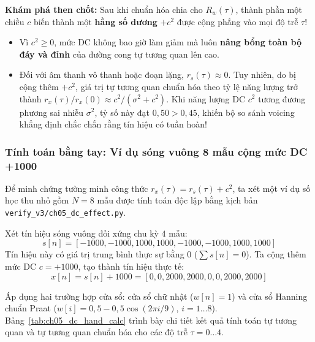 \begin{physicalinsight}
\textbf{Khám phá then chốt:} Sau khi chuẩn hóa chia cho $R_w(\tau)$, thành phần một chiều $c$ biến thành một \textbf{hằng số dương} $+c^2$ được cộng phẳng vào mọi độ trễ $\tau$!
\begin{itemize}[leftmargin=1.5em, itemsep=2pt]
    \item Vì $c^2 \ge 0$, mức DC không bao giờ làm giảm mà luôn \textbf{nâng bổng toàn bộ đáy và đỉnh} của đường cong tự tương quan lên cao.
    \item Đối với âm thanh vô thanh hoặc đoạn lặng, $r_s(\tau) \approx 0$. Tuy nhiên, do bị cộng thêm $+c^2$, giá trị tự tương quan chuẩn hóa theo tỷ lệ năng lượng trở thành $r_x(\tau)/r_x(0) \approx c^2 / (\sigma^2 + c^2)$. Khi năng lượng DC $c^2$ tương đương phương sai nhiễu $\sigma^2$, tỷ số này đạt $0{,}50 > 0{,}45$, khiến bộ so sánh voicing khẳng định chắc chắn rằng tín hiệu có tuần hoàn!
\end{itemize}
\end{physicalinsight}

\subsubsection*{Tính toán bằng tay: Ví dụ sóng vuông 8 mẫu cộng mức DC +1000}
Để minh chứng tường minh công thức $r_x(\tau) = r_s(\tau) + c^2$, ta xét một ví dụ số học thu nhỏ gồm $N = 8$ mẫu được tính toán độc lập bằng kịch bản \texttt{verify\_v3/ch05\_dc\_effect.py}. 

Xét tín hiệu sóng vuông đối xứng chu kỳ $4$ mẫu:
\begin{equation}
s[n] = [-1000, -1000, 1000, 1000, -1000, -1000, 1000, 1000]
\end{equation}
Tín hiệu này có giá trị trung bình thực sự bằng $0$ ($\sum s[n] = 0$). Ta cộng thêm mức DC $c = +1000$, tạo thành tín hiệu thực tế:
\begin{equation}
x[n] = s[n] + 1000 = [0, 0, 2000, 2000, 0, 0, 2000, 2000]
\end{equation}

Áp dụng hai trường hợp cửa sổ: cửa sổ chữ nhật ($w[n] = 1$) và cửa sổ Hanning chuẩn Praat ($w[i] = 0{,}5 - 0{,}5\cos(2\pi i / 9)$, $i = 1 \dots 8$). Bảng~\ref{tab:ch05_dc_hand_calc} trình bày chi tiết kết quả tính toán tự tương quan và tự tương quan chuẩn hóa cho các độ trễ $\tau = 0 \dots 4$.

